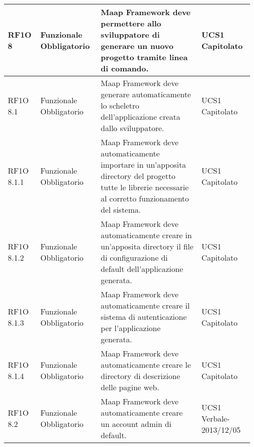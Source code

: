 \begin{center}
\begin{longtable}{ | l | p{2cm} | p{5cm} | p{1.7cm} |}
        RF1O 8  & Funzionale \newline  Obbligatorio  & Maap Framework deve permettere allo sviluppatore di generare un nuovo progetto tramite linea di comando.
 &  UCS1 \newline  Capitolato \newline  \\ \hline      
        RF1O 8.1  & Funzionale \newline  Obbligatorio  & Maap Framework deve generare automaticamente lo scheletro dell'applicazione creata dallo sviluppatore.
 &  UCS1 \newline  Capitolato \newline  \\ \hline      
        RF1O 8.1.1  & Funzionale \newline  Obbligatorio  & Maap Framework deve automaticamente importare in un'apposita directory del progetto tutte le librerie necessarie al corretto funzionamento del sistema.
 &  UCS1 \newline  Capitolato \newline  \\ \hline      
        RF1O 8.1.2 & Funzionale \newline  Obbligatorio  & Maap Framework deve automaticamente creare in un'apposita directory il file di configurazione di default dell'applicazione generata.
 &  UCS1 \newline  Capitolato \newline  \\ \hline      
        RF1O 8.1.3  & Funzionale \newline  Obbligatorio  & Maap Framework deve automaticamente creare il sistema di autenticazione per l'applicazione generata. &  UCS1 \newline  Capitolato \newline  \\ \hline      
        RF1O 8.1.4  & Funzionale \newline  Obbligatorio  & Maap Framework deve automaticamente creare le directory di descrizione delle pagine web.
 &  UCS1 \newline  Capitolato \newline  \\ \hline      
        RF1O 8.2  & Funzionale \newline  Obbligatorio  & Maap Framework deve automaticamente creare un account admin di default. &  UCS1 \newline  Verbale-2013/12/05 \newline  \\ \hline      

\end{longtable}
\end{center}
